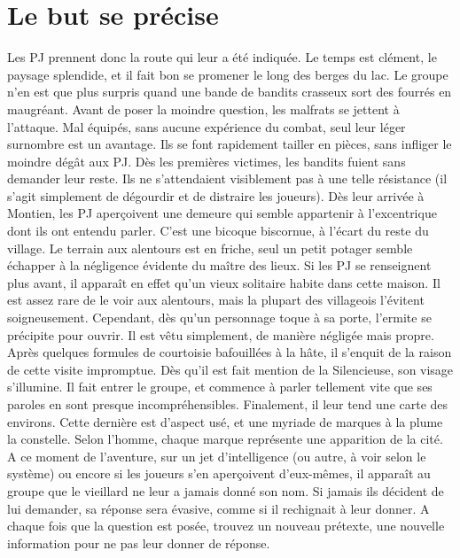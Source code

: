 \documentclass[a4paper]{article}
\begin{document}
\section{Le but se précise}
Les PJ prennent donc la route qui leur a été indiquée. Le temps est clément, le paysage splendide, et il fait bon se promener le long des berges du lac. Le groupe n'en est que plus surpris quand une bande de bandits crasseux sort des fourrés en maugréant. Avant de poser la moindre question, les malfrats se jettent à l'attaque. Mal équipés, sans aucune expérience du combat, seul leur léger surnombre est un avantage. Ils se font rapidement tailler en pièces, sans infliger le moindre dégât aux PJ. Dès les premières victimes, les bandits fuient sans demander leur reste. Ils ne s'attendaient visiblement pas à une telle résistance (il s'agit simplement de dégourdir et de distraire les joueurs).
\newline
Dès leur arrivée à Montien, les PJ aperçoivent une demeure qui semble appartenir à l'excentrique dont ils ont entendu parler. C'est une bicoque biscornue, à l'écart du reste du village. Le terrain aux alentours est en friche, seul un petit potager semble échapper à la négligence évidente du maître des lieux. Si les PJ se renseignent plus avant, il apparaît en effet qu'un vieux solitaire habite dans cette maison. Il est assez rare de le voir aux alentours, mais la plupart des villageois l'évitent soigneusement. Cependant, dès qu'un personnage toque à sa porte, l'ermite se précipite pour ouvrir. Il est vêtu simplement, de manière négligée mais propre. Après quelques formules de courtoisie bafouillées à la hâte, il s'enquit de la raison de cette visite impromptue. Dès qu'il est fait mention de la Silencieuse, son visage s'illumine. Il fait entrer le groupe, et commence à parler tellement vite que ses paroles en sont presque incompréhensibles. Finalement, il leur tend une carte des environs. Cette dernière est d'aspect usé, et une myriade de marques à la plume la constelle. Selon l'homme, chaque marque représente une apparition de la cité. A ce moment de l'aventure, sur un jet d'intelligence (ou autre, à voir selon le système) ou encore si les joueurs s'en aperçoivent d'eux-mêmes, il apparaît au groupe que le vieillard ne leur a jamais donné son nom. Si jamais ils décident de lui demander, sa réponse sera évasive, comme si il rechignait à leur donner. A chaque fois que la question est posée, trouvez un nouveau prétexte, une nouvelle information pour ne pas leur donner de réponse.
\end{document}
